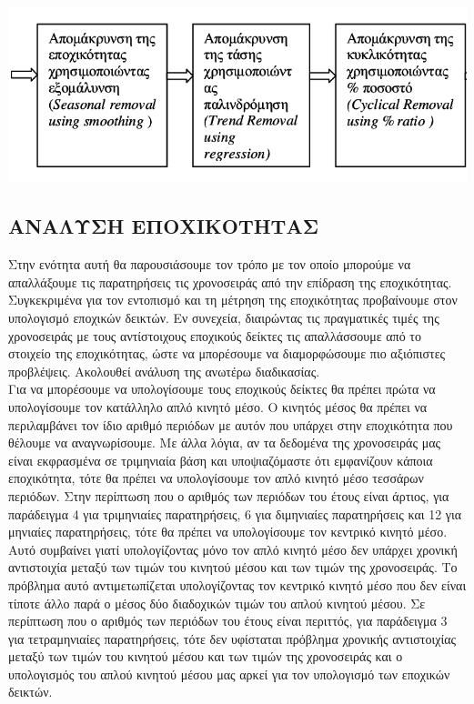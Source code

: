 \begin{center}
\includegraphics[scale=0.5]{graf19.png}\\   
\end{center} 
\subsection{ΑΝΑΛΥΣΗ ΕΠΟΧΙΚΟΤΗΤΑΣ }
Στην ενότητα αυτή θα παρουσιάσουμε τον τρόπο με τον οποίο μπορούμε να απαλλάξουμε τις παρατηρήσεις τις χρονοσειράς από την επίδραση της εποχικότητας. Συγκεκριμένα για τον εντοπισμό και τη μέτρηση της εποχικότητας προβαίνουμε στον υπολογισμό εποχικών δεικτών.
Εν συνεχεία, διαιρώντας τις πραγματικές τιμές της χρονοσειράς με τους
αντίστοιχους εποχικούς δείκτες τις απαλλάσσουμε από το στοιχείο της
εποχικότητας, ώστε να μπορέσουμε να διαμορφώσουμε πιο αξιόπιστες
προβλέψεις. Ακολουθεί ανάλυση της ανωτέρω διαδικασίας.\\

Για να μπορέσουμε να υπολογίσουμε τους εποχικούς δείκτες θα πρέπει
πρώτα να υπολογίσουμε τον κατάλληλο απλό κινητό μέσο. Ο κινητός μέσος
θα πρέπει να περιλαμβάνει τον ίδιο αριθμό περιόδων με αυτόν που υπάρχει
στην εποχικότητα που θέλουμε να αναγνωρίσουμε. Με άλλα λόγια, αν τα
δεδομένα της χρονοσειράς μας είναι εκφρασμένα σε τριμηνιαία βάση και
υποψιαζόμαστε ότι εμφανίζουν κάποια εποχικότητα, τότε θα πρέπει να
υπολογίσουμε τον απλό κινητό μέσο τεσσάρων περιόδων. Στην περίπτωση
που ο αριθμός των περιόδων του έτους είναι άρτιος, για παράδειγμα 4 για
τριμηνιαίες παρατηρήσεις, 6 για διμηνιαίες παρατηρήσεις και 12 για μηνιαίες παρατηρήσεις, τότε θα πρέπει να υπολογίσουμε τον κεντρικό κινητό μέσο. Αυτό συμβαίνει γιατί υπολογίζοντας μόνο τον απλό κινητό μέσο δεν υπάρχει χρονική αντιστοιχία μεταξύ των τιμών του κινητού μέσου και των τιμών της χρονοσειράς. Το πρόβλημα αυτό αντιμετωπίζεται υπολογίζοντας τον κεντρικό κινητό μέσο που δεν είναι τίποτε άλλο παρά ο μέσος δύο διαδοχικών τιμών του απλού κινητού μέσου. Σε περίπτωση που ο αριθμός των περιόδων του
έτους είναι περιττός, για παράδειγμα 3 για τετραμηνιαίες παρατηρήσεις, τότε δεν υφίσταται πρόβλημα χρονικής αντιστοιχίας μεταξύ των τιμών του κινητού μέσου και των τιμών της χρονοσειράς και ο υπολογισμός του απλού κινητού μέσου μας αρκεί για τον υπολογισμό των εποχικών δεικτών.\\

